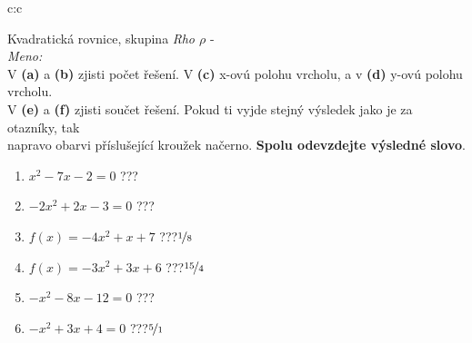\documentclass[10pt]{report}
\begin{document}
\clearpage
\thispagestyle{empty}
\begin{tabular}{c:c}
\begin{minipage}[c][99mm][t]{0.49\linewidth}
\begin{center}
\vspace{7mm}
{\huge Kvadratická rovnice, skupina \textit{Rho $\rho$} -}\\[4.5mm]
\textit{Meno:}\phantom{xxxxxxxxxxxxxxxxxxxxxxxxxxxxxxxxxxxxxxxxxxxxxxxxxxxxxxxxxxxxxxxxx}\\[3.5mm]
V \textbf{(a)} a \textbf{(b)} zjisti počet řešení. V \textbf{(c)} x-ovú polohu vrcholu, a v \textbf{(d)} y-ovú polohu vrcholu.\\V \textbf{(e)} a \textbf{(f)} zjisti součet řešení. Pokud ti vyjde stejný výsledek jako je za otazníky, tak\\napravo obarvi příslušející kroužek načerno. \textbf{Spolu odevzdejte výsledné slovo}.\\[3mm]
\begin{minipage}{0.77\linewidth}
\begin{center}
\begin{varwidth}{\textwidth}
\begin{enumerate}
\large
\item $x^2-7x-2=0$\quad \dotfill\; ???\;\dotfill {}
\item $-2x^2+2x-3=0$\quad \dotfill\; ???\;\dotfill {}
\item $f(x)=-4x^2+x+7$\quad \dotfill\; ???\;\dotfill \quad $\nicefrac{1}{8}$
\item $f(x)=-3x^2+3x+6$\quad \dotfill\; ???\;\dotfill \quad $\nicefrac{15}{4}$
\item $-x^2-8x-12=0$\quad \dotfill\; ???\;\dotfill {}
\item $-x^2+3x+4=0$\quad \dotfill\; ???\;\dotfill \quad $\nicefrac{5}{1}$
\end{enumerate}
\end{varwidth}
\end{center}
\end{minipage}

\end{center}
\end{minipage}
\end{tabular}
\end{document}
